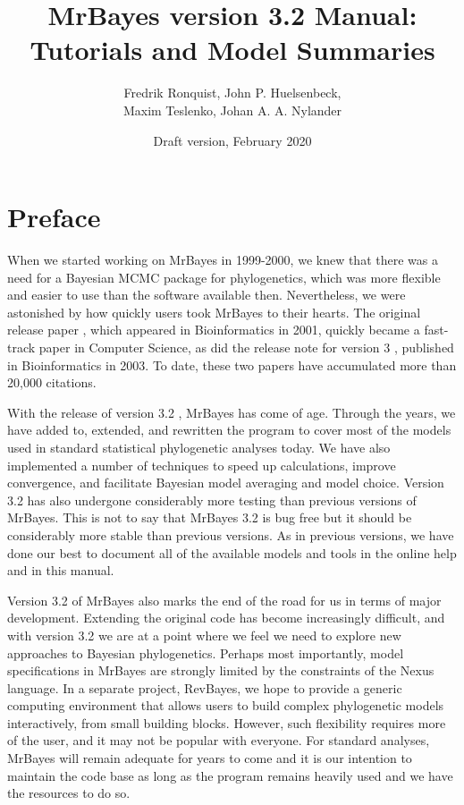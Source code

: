 \documentclass[12pt]{book}
\begin{document}
\title{MrBayes version 3.2 Manual: \\ Tutorials and Model Summaries}

\date{\large Draft version, February 2020}

\author{Fredrik Ronquist, John P. Huelsenbeck, \\ Maxim Teslenko, Johan A. A. Nylander}

\maketitle

\tableofcontents

\newpage

\frontmatter

\chapter{Preface}
\label{preface}

When we started working on MrBayes in 1999-2000, we knew that there was a need for a Bayesian MCMC
package for phylogenetics, which was more flexible and easier to use than the software available
then. Nevertheless, we were astonished by how quickly users took MrBayes to their hearts. The
original release paper \citep{huelsenbeck01c}, which appeared in Bioinformatics in 2001, quickly
became a fast-track paper in Computer Science, as did the release note for version 3
\citep{ronquist03}, published in Bioinformatics in 2003. To date, these two papers have accumulated
more than 20,000 citations.

With the release of version 3.2 \citep{ronquist12a}, MrBayes has come of age. Through the years, we
have added to, extended, and rewritten the program to cover most of the models used in standard
statistical phylogenetic analyses today. We have also implemented a number of techniques to speed
up calculations, improve convergence, and facilitate Bayesian model averaging and model choice.
Version 3.2 has also undergone considerably more testing than previous versions of MrBayes. This
is not to say that MrBayes 3.2 is bug free but it should be considerably more stable than previous
versions. As in previous versions, we have done our best to document all of the available models
and tools in the online help and in this manual.

Version 3.2 of MrBayes also marks the end of the road for us in terms of major development.
Extending the original code has become increasingly difficult, and with version 3.2 we are at a
point where we feel we need to explore new approaches to Bayesian phylogenetics. Perhaps most
importantly, model specifications in MrBayes are strongly limited by the constraints of the Nexus
language. In a separate project, RevBayes, we hope to provide a generic computing environment that
allows users to build complex phylogenetic models interactively, from small building blocks.
However, such flexibility requires more of the user, and it may not be popular with everyone. For
standard analyses, MrBayes will remain adequate for years to come and it is our intention to
maintain the code base as long as the program remains heavily used and we have the resources to do
so.
\end{document}
